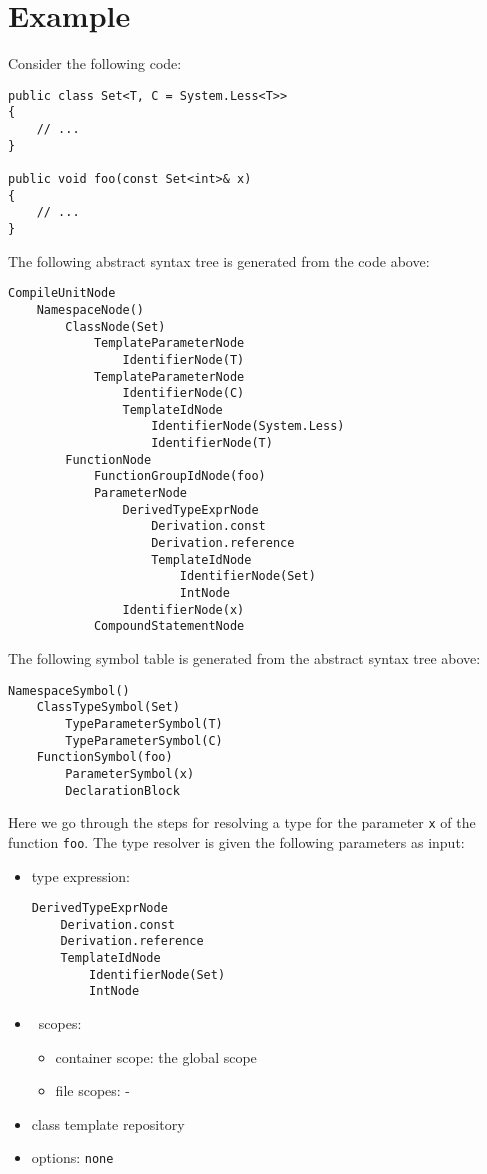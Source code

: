 \documentclass[a4paper,oneside,11pt]{book}
\theoremstyle{definition}
\begin{document}
\clearpage
\section{Example}

Consider the following code:

\lstset{language=Cmajor}
\begin{lstlisting}[frame=trBL]
public class Set<T, C = System.Less<T>>
{
    // ...
}

public void foo(const Set<int>& x)
{
    // ...
}
\end{lstlisting}

\begin{flushleft}
The following abstract syntax tree is generated from the code above:
\begin{verbatim}
CompileUnitNode
    NamespaceNode()
        ClassNode(Set)
            TemplateParameterNode
                IdentifierNode(T)
            TemplateParameterNode
                IdentifierNode(C)
                TemplateIdNode
                    IdentifierNode(System.Less)
                    IdentifierNode(T)
        FunctionNode
            FunctionGroupIdNode(foo)
            ParameterNode
                DerivedTypeExprNode
                    Derivation.const
                    Derivation.reference
                    TemplateIdNode
                        IdentifierNode(Set)
                        IntNode
                IdentifierNode(x)
            CompoundStatementNode
\end{verbatim}

The following symbol table is generated from the abstract syntax tree above:
\begin{verbatim}
NamespaceSymbol()
    ClassTypeSymbol(Set)
        TypeParameterSymbol(T)
        TypeParameterSymbol(C)
    FunctionSymbol(foo)
        ParameterSymbol(x)
        DeclarationBlock
\end{verbatim}

Here we go through the steps for resolving a type for the parameter \verb|x| of the function \verb|foo|.
The type resolver is given the following parameters as input:
\begin{itemize}
\item
type expression:
\begin{verbatim}
DerivedTypeExprNode
    Derivation.const
    Derivation.reference
    TemplateIdNode
        IdentifierNode(Set)
        IntNode
\end{verbatim}
\item\
scopes:
\begin{itemize}
\item
container scope: the global scope
\item
file scopes: -
\end{itemize}
\item
class template repository
\item
options: \verb|none|
\end{itemize}


\end{flushleft}
\end{document}
